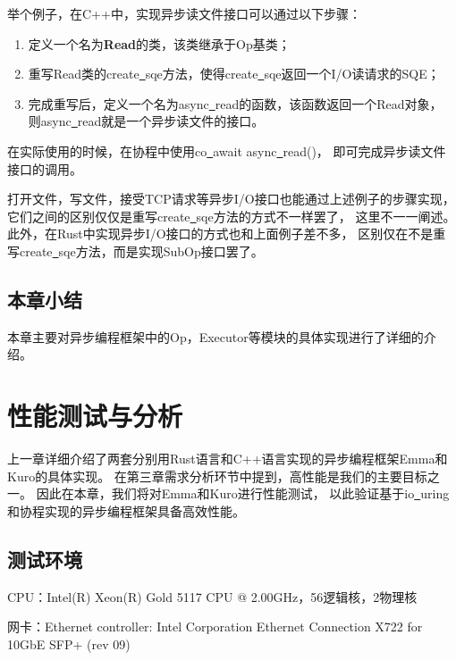 \documentclass[supercite]{HustGraduPaper}
\theoremstyle{definition}
\begin{document}
举个例子，在C++中，实现异步读文件接口可以通过以下步骤：

\begin{enumerate}
  \item 定义一个名为\textbf{Read}的类，该类继承于Op基类；
  \item 重写Read类的create\underline{~}sqe方法，使得create\underline{~}sqe返回一个I/O读请求的SQE；
  \item 完成重写后，定义一个名为async\underline{~}read的函数，该函数返回一个Read对象，
    则async\underline{~}read就是一个异步读文件的接口。
\end{enumerate}

在实际使用的时候，在协程中使用co\underline{~}await async\underline{~}read()，
即可完成异步读文件接口的调用。\par

打开文件，写文件，接受TCP请求等异步I/O接口也能通过上述例子的步骤实现，
它们之间的区别仅仅是重写create\underline{~}sqe方法的方式不一样罢了，
这里不一一阐述。此外，在Rust中实现异步I/O接口的方式也和上面例子差不多，
区别仅在不是重写create\underline{~}sqe方法，而是实现SubOp接口罢了。\par

\subsection{本章小结}

本章主要对异步编程框架中的Op，Executor等模块的具体实现进行了详细的介绍。\par

\section{性能测试与分析}
上一章详细介绍了两套分别用Rust语言和C++语言实现的异步编程框架Emma和Kuro的具体实现。
在第三章需求分析环节中提到，高性能是我们的主要目标之一。
因此在本章，我们将对Emma和Kuro进行性能测试，
以此验证基于io\underline{~}uring和协程实现的异步编程框架具备高效性能。\par

\subsection{测试环境}
CPU：Intel(R) Xeon(R) Gold 5117 CPU @ 2.00GHz，56逻辑核，2物理核\par

网卡：Ethernet controller: Intel Corporation Ethernet Connection X722 for 10GbE SFP+ (rev 09)\par
\end{document}
